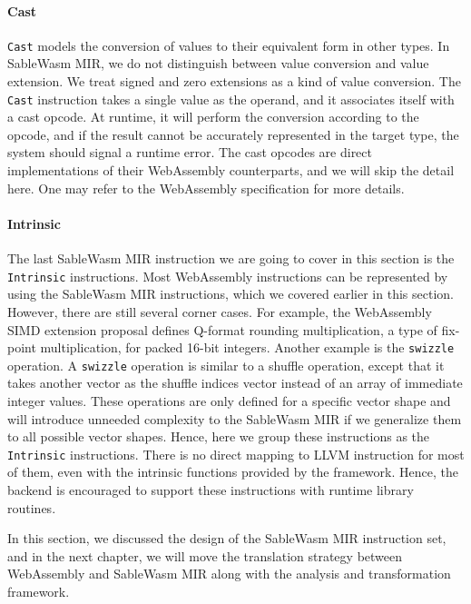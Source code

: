 \paragraph{Cast}
\texttt{Cast} models the conversion of values to their equivalent form in other
types. In SableWasm MIR, we do not distinguish between value conversion and
value extension. We treat signed and zero extensions as a kind of value
conversion. The \texttt{Cast} instruction takes a single value as the operand,
and it associates itself with a cast opcode. At runtime, it will perform the
conversion according to the opcode, and if the result cannot be accurately
represented in the target type, the system should signal a runtime error.
The cast opcodes are direct implementations of their WebAssembly counterparts,
and we will skip the detail here. One may refer to the WebAssembly specification
for more details.

\paragraph{Intrinsic}
The last SableWasm MIR instruction we are going to cover in this section is the
\texttt{Intrinsic} instructions. Most WebAssembly instructions can be
represented by using the SableWasm MIR instructions, which we covered earlier in
this section. However, there are still several corner cases. For example, the
WebAssembly SIMD extension proposal defines Q-format rounding multiplication, a
type of fix-point multiplication, for packed 16-bit integers. Another example is
the \texttt{swizzle} operation. A \texttt{swizzle} operation is similar to a
shuffle operation, except that it takes another vector as the shuffle indices
vector instead of an array of immediate integer values. These operations are
only defined for a specific vector shape and will introduce unneeded complexity
to the SableWasm MIR if we generalize them to all possible vector shapes. Hence,
here we group these instructions as the \texttt{Intrinsic} instructions. There
is no direct mapping to LLVM instruction for most of them, even with the
intrinsic functions provided by the framework. Hence, the backend is encouraged
to support these instructions with runtime library routines.

In this section, we discussed the design of the SableWasm MIR instruction set,
and in the next chapter, we will move the translation strategy between
WebAssembly and SableWasm MIR along with the analysis and transformation
framework.